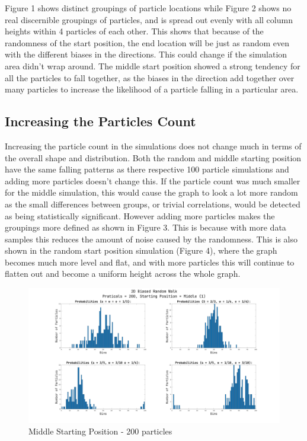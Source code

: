 \documentclass[a4paper]{article}
\begin{document}
\newpage
Figure 1 shows distinct groupings of particle locations while Figure 2 shows no real discernible groupings of particles, and is spread out evenly with all column heights within 4 particles of each other. This shows that because of the randomness of the start position, the end location will be just as random even with the different biases in the directions. This could change if the simulation area didn't wrap around. The middle start position showed a strong tendency for all the particles to fall together, as the biases in the direction add together over many particles to increase the likelihood of a particle falling in a particular area.

\subsection{Increasing the Particles Count}
Increasing the particle count in the simulations does not change much in terms of the overall shape and distribution. Both the random and middle starting position have the same falling patterns as there respective 100 particle simulations and adding more particles doesn't change this. If the particle count was much smaller for the middle simulation, this would cause the graph to look a lot more random as the small differences between groups, or trivial correlations, would be detected as being statistically significant. However adding more particles makes the groupings more defined as shown in Figure 3. This is because with more data samples this reduces the amount of noise caused by the randomness. This is also shown in the random start position simulation (Figure 4), where the graph becomes much more level and flat, and with more particles this will continue to flatten out and become a uniform height across the whole graph.

\begin{figure}[h!]
  \includegraphics[width=\textwidth]{part1/p1_figure2}
  \caption{Middle Starting Position - 200 particles}
  \label{fig:msp200}
\end{figure}
\end{document}
